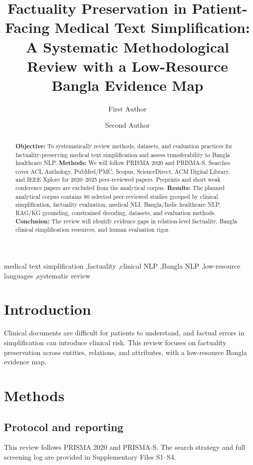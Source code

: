 \documentclass[review]{elsarticle}
\begin{document}
\begin{frontmatter}

\title{Factuality Preservation in Patient-Facing Medical Text Simplification: A Systematic Methodological Review with a Low-Resource Bangla Evidence Map}

\author[inst1]{First Author}
\author[inst1]{Second Author}
\address[inst1]{Bangla Clinical NLP Initiative}

\begin{abstract}
\textbf{Objective:} To systematically review methods, datasets, and evaluation practices for factuality-preserving medical text simplification and assess transferability to Bangla healthcare NLP. 
\textbf{Methods:} We will follow PRISMA 2020 and PRISMA-S. Searches cover ACL Anthology, PubMed/PMC, Scopus, ScienceDirect, ACM Digital Library, and IEEE Xplore for 2020--2025 peer-reviewed papers. Preprints and short weak conference papers are excluded from the analytical corpus. 
\textbf{Results:} The planned analytical corpus contains 80 selected peer-reviewed studies grouped by clinical simplification, factuality evaluation, medical NLI, Bangla/Indic healthcare NLP, RAG/KG grounding, constrained decoding, datasets, and evaluation methods. 
\textbf{Conclusion:} The review will identify evidence gaps in relation-level factuality, Bangla clinical simplification resources, and human evaluation rigor.
\end{abstract}

\begin{keyword}
medical text simplification \sep factuality \sep clinical NLP \sep Bangla NLP \sep low-resource languages \sep systematic review
\end{keyword}

\end{frontmatter}

\section{Introduction}
Clinical documents are difficult for patients to understand, and factual errors in simplification can introduce clinical risk. This review focuses on factuality preservation across entities, relations, and attributes, with a low-resource Bangla evidence map.

\section{Methods}
\subsection{Protocol and reporting}
This review follows PRISMA 2020 and PRISMA-S. The search strategy and full screening log are provided in Supplementary Files S1--S4.
\end{document}
